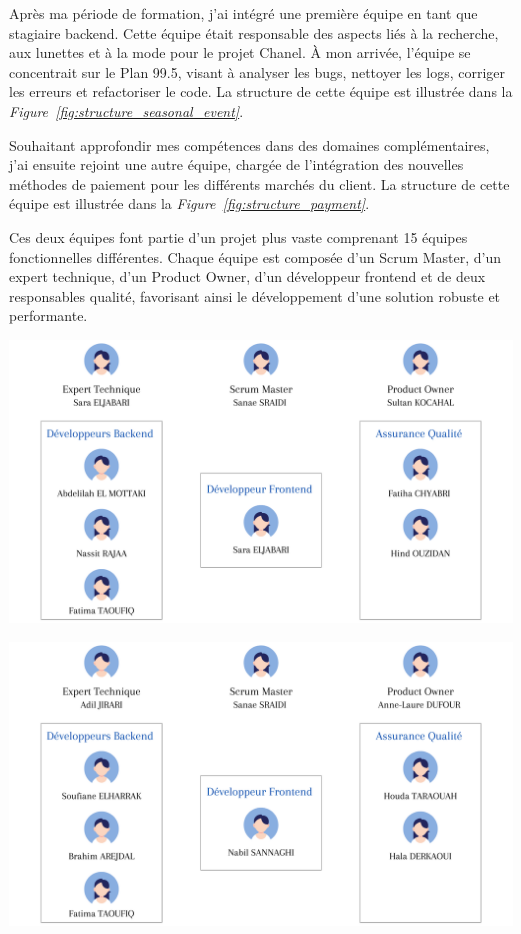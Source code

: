 Après ma période de formation, j’ai intégré une première équipe en tant que stagiaire backend. Cette équipe était responsable des aspects liés à la recherche, aux lunettes et à la mode pour le projet Chanel. À mon arrivée, l'équipe se concentrait sur le Plan 99.5, visant à analyser les bugs, nettoyer les logs, corriger les erreurs et refactoriser le code. La structure de cette équipe est illustrée dans la \textit{Figure~\ref{fig:structure_seasonal_event}}.

Souhaitant approfondir mes compétences dans des domaines complémentaires, j'ai ensuite rejoint une autre équipe, chargée de l’intégration des nouvelles méthodes de paiement pour les différents marchés du client. La structure de cette équipe est illustrée dans la \textit{Figure~\ref{fig:structure_payment}}.

Ces deux équipes font partie d'un projet plus vaste comprenant 15 équipes fonctionnelles différentes. Chaque équipe est composée d'un Scrum Master, d'un expert technique, d'un Product Owner, d'un développeur frontend et de deux responsables qualité, favorisant ainsi le développement d'une solution robuste et performante.

\begin{center}
    \centering
    \includegraphics[width=19cm]{Figures/Seasonal Event Team.png}
    \label{fig:structure_seasonal_event}
\end{center}

\begin{center}
    \centering
    \includegraphics[width=19cm]{Figures/Cart Checkout & Payment.png}
    \label{fig:structure_payment}
\end{center}


